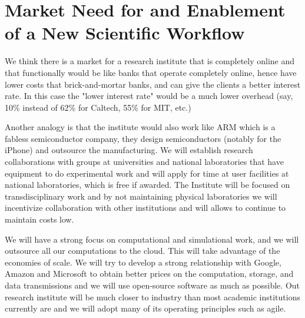 \section{Market Need for and Enablement of a New Scientific Workflow}

We think there is a market for a research institute that is completely online and that functionally would be like banks that operate completely online, hence have lower costs that brick-and-mortar banks, and can give the clients a better interest rate. In this case the "lower interest rate" would be a much lower overhead (say, 10\% instead of 62\% for Caltech, 55\% for MIT, etc.) 

Another analogy is that the institute would also work like ARM which is a fabless semiconductor company, they design semiconductors (notably for the iPhone) and outsource the manufacturing. We will establish research collaborations with groups at universities and national laboratories that have equipment to do experimental work and will apply for time at user facilities at national laboratories, which is free if awarded. The Institute will be focused on transdisciplinary work and by not maintaining physical laboratories we will incentivize collaboration with other institutions and will allows to continue to maintain costs low. 

We will have a strong focus on computational and simulational work, and we will outsource all our computations to the cloud. This will take advantage of the economies of scale. We will try to develop a strong relationship with Google, Amazon and Microsoft to obtain better prices on the computation, storage, and data transmissions and we will use open-source software as much as possible. Out research institute will be much closer to industry than most academic institutions currently are and we will adopt many of its operating principles such as agile. 

